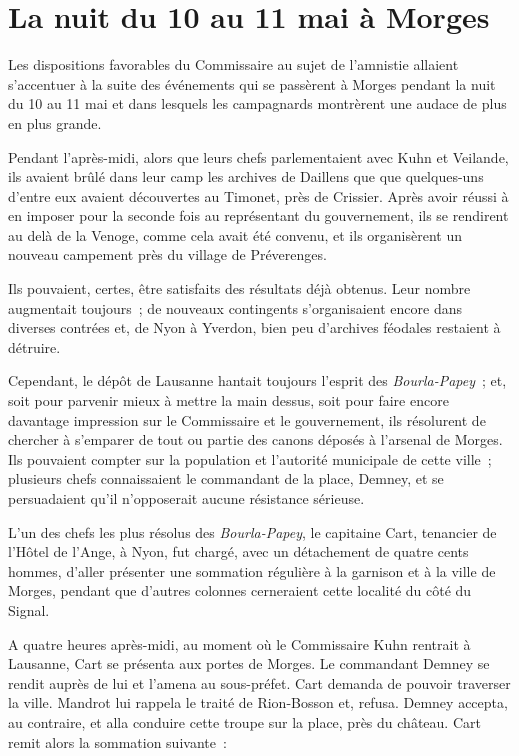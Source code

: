 \documentclass[french,twoside]{book} %
\begin{document}
\section[{La nuit du 10 au 11 mai à Morges}]{La nuit du 10 au 11 mai à Morges}
\noindent Les dispositions favorables du Commissaire au sujet de l’amnistie allaient s’accentuer à la suite des événements qui se passèrent à Morges pendant la nuit du 10 au 11 mai et dans lesquels les campagnards montrèrent une audace de plus en plus grande.\par
Pendant l’après-midi, alors que leurs chefs parlementaient avec Kuhn et Veilande, ils avaient brûlé dans leur camp les archives de Daillens que que quelques-uns d’entre eux avaient découvertes au Timonet, près de Crissier. Après avoir réussi à en imposer pour la seconde fois au représentant du gouvernement, ils se rendirent au delà de la Venoge, comme cela avait été convenu, et ils organisèrent un nouveau campement près du village de Préverenges.\par
Ils pouvaient, certes, être satisfaits des résultats déjà obtenus. Leur nombre augmentait toujours ; de nouveaux contingents s’organisaient encore dans diverses contrées et, de Nyon à Yverdon, bien peu d’archives féodales restaient à détruire.\par
Cependant, le dépôt de Lausanne hantait toujours l’esprit des \emph{Bourla-Papey} ; et, soit pour parvenir mieux à mettre la main dessus, soit pour faire encore davantage impression sur le Commissaire et le gouvernement, ils résolurent de chercher à s’emparer de tout ou partie des canons déposés à l’arsenal de Morges. Ils pouvaient compter sur la population et l’autorité municipale de cette ville ; plusieurs chefs connaissaient le commandant de la place, Demney, et se persuadaient qu’il n’opposerait aucune résistance sérieuse.\par
L’un des chefs les plus résolus des \emph{Bourla-Papey}, le capitaine Cart, tenancier de l’Hôtel de l’Ange, à Nyon, fut chargé, avec un détachement de quatre cents hommes, d’aller présenter une sommation régulière à la garnison et à la ville de Morges, pendant que d’autres colonnes cerneraient cette localité du côté du Signal.\par
A quatre heures après-midi, au moment où le Commissaire Kuhn rentrait à Lausanne, Cart se présenta aux portes de Morges. Le commandant Demney se rendit auprès de lui et l’amena au sous-préfet. Cart demanda de pouvoir traverser la ville. Mandrot lui rappela le traité de Rion-Bosson et, refusa. Demney accepta, au contraire, et alla conduire cette troupe sur la place, près du château. Cart remit alors la sommation suivante :\par
\end{document}
